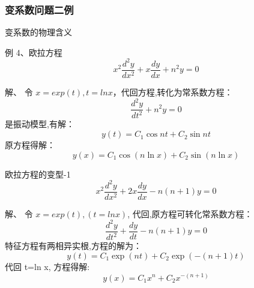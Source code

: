 \begin{frame}
    \frametitle{变系数问题二例}
     变系数的物理含义
        \begin{exampleblock} {例 4、欧拉方程}
        \begin{equation*}
            x^2 \frac{d^2 y}{d x^2} +x \frac{d y}{d x} +n^2 y =0 
        \end{equation*}     
        \end{exampleblock}	
        \alert{解、}  令 $x=exp(t) , t=ln x $，代回方程,转化为常系数方程：
        \begin{equation*}
            \frac{d^2 y}{d t^2}  +n^2 y =0 
        \end{equation*}     
        是振动模型,有解：\[ 	y(t)=C_1 \cos n t +C_2 \sin n t \]
        原方程得解：
        \begin{equation*}
            y(x)=C_1 \cos (n \ln x) +C_2 \sin (n \ln x)
        \end{equation*}   
\end{frame}
\begin{frame}
        \begin{exampleblock} {欧拉方程的变型-1}
        \begin{equation*}
            x^2 \frac{d^2 y}{d x^2} +2x \frac{d y}{d x} -n(n+1) y =0 
        \end{equation*}     
        \end{exampleblock}
        \alert{解、} 	令 $x=exp(t) , (t=ln x) $, 代回,原方程可转化常系数方程：
        \begin{equation*}
            \frac{d^2 y}{d t^2}  +\frac{dy}{dt}-n(n+1) y =0 
        \end{equation*}     
        特征方程有两相异实根,方程的解为：
        \begin{equation*}
            y(t)=C_1 \exp (nt) +C_2 \exp (-(n+1) t)
        \end{equation*}  
        代回 t=ln x, 方程得解:
        \begin{equation*}
            y(x)=C_1 x^n +C_2 x^{-(n+1) }
        \end{equation*}  
\end{frame}

